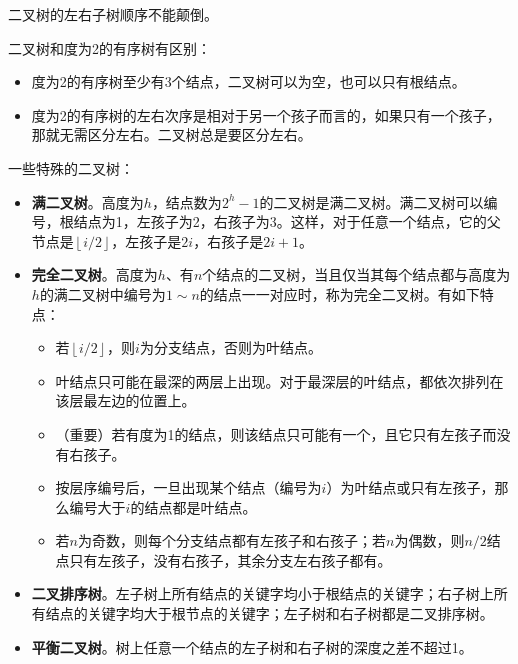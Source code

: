 \documentclass[12pt, a4paper, oneside]{ctexart}
\begin{document}
二叉树的左右子树顺序不能颠倒。

二叉树和度为2的有序树有区别：
\begin{itemize}
  \item 度为2的有序树至少有3个结点，二叉树可以为空，也可以只有根结点。
  \item 度为2的有序树的左右次序是相对于另一个孩子而言的，如果只有一个孩子，那就无需区分左右。二叉树总是要区分左右。
\end{itemize}

一些特殊的二叉树：
\begin{itemize}
  \item {\bf 满二叉树}。高度为$h$，结点数为$2^h-1$的二叉树是满二叉树。满二叉树可以编号，根结点为1，左孩子为2，右孩子为3。这样，对于任意一个结点，它的父节点是$\left\lfloor i/2 \right\rfloor$，左孩子是$2i$，右孩子是$2i+1$。
  \item {\bf 完全二叉树}。高度为$h$、有$n$个结点的二叉树，当且仅当其每个结点都与高度为$h$的满二叉树中编号为$1\sim n$的结点一一对应时，称为完全二叉树。有如下特点：
  \begin{itemize}
    \item 若$\left\lfloor i/2 \right\rfloor$，则$i$为分支结点，否则为叶结点。
    \item 叶结点只可能在最深的两层上出现。对于最深层的叶结点，都依次排列在该层最左边的位置上。
    \item （重要）若有度为1的结点，则该结点只可能有一个，且它只有左孩子而没有右孩子。
    \item 按层序编号后，一旦出现某个结点（编号为$i$）为叶结点或只有左孩子，那么编号大于$i$的结点都是叶结点。
    \item 若$n$为奇数，则每个分支结点都有左孩子和右孩子；若$n$为偶数，则$n/2$结点只有左孩子，没有右孩子，其余分支左右孩子都有。
  \end{itemize}

  \item {\bf 二叉排序树}。左子树上所有结点的关键字均小于根结点的关键字；右子树上所有结点的关键字均大于根节点的关键字；左子树和右子树都是二叉排序树。
  \item {\bf 平衡二叉树}。树上任意一个结点的左子树和右子树的深度之差不超过1。
\end{itemize}
\end{document}
